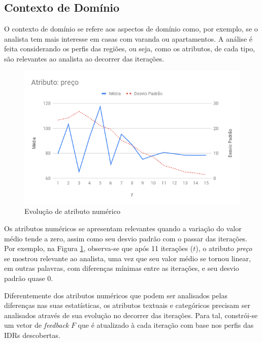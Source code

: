 
\subsection{Contexto de Domínio}

O contexto de domínio se refere aos aspectos de domínio como, por exemplo, se o analista tem mais interesse em casas com varanda ou apartamentos. A análise é feita considerando os perfis das regiões, ou seja, como os atributos, de cada tipo, são relevantes ao analista ao decorrer das iterações.

\begin{figure}[]
	\caption{Evolução de atributo numérico}
	\label{fig:analise-atributo-numerico}
	\centering
	\includegraphics[width=\textwidth]{imagens/analise-atributo-numerico}
	\mfonte
\end{figure}

Os atributos numéricos se apresentam relevantes quando a variação do valor médio tende a zero, assim como seu desvio padrão com o passar das iterações. Por exemplo, na Figura \ref{fig:analise-atributo-numerico}, observa-se que após 11 iterações ($t$), o atributo {\em preço} se mostrou relevante ao analista, uma vez que seu valor médio se tornou linear, em outras palavras, com diferenças mínimas entre as iterações, e seu desvio padrão quase 0.


Diferentemente dos atributos numéricos que podem ser analisados pelas diferenças nas suas estatísticas, os atributos textuais e categóricos precisam ser analisados através de sua evolução no decorrer das iterações. Para tal, constrói-se um vetor de {\em feedback} $F$ que é atualizado à cada iteração com base nos perfis das IDRs descobertas.

